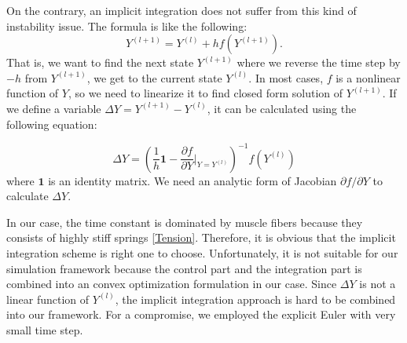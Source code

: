 \documentclass[master,english,final]{kaist-ucs}
\begin{document}
On the contrary, an implicit integration does not suffer from this kind of
instability issue. The formula is like the following:
\begin{equation}
Y^{(l+1)}=Y^{(l)} + hf(Y^{(l+1)}).
\end{equation}
That is, we want to find the next state $Y^{(l+1)}$ where we
reverse the time step by $-h$ from $Y^{(l+1)}$, we get to the current state
$Y^{(l)}$. In most cases, $f$ is a nonlinear function of $Y$, so we need to
linearize it to find closed form solution of $Y^{(l+1)}$. If we define a
variable $\Delta Y = Y^{(l+1)}-Y^{(l)}$, it can be calculated using the
following equation:

\begin{equation}\label{DeltaY}
\Delta Y = \left(  \frac{1}{h}\mathbf{1} - {\frac{\partial f}{\partial Y} \bigg|_{Y=Y^{(l)}}}\right)^{-1} f(Y^{(l)})
\end{equation}
where $\mathbf{1}$ is an identity matrix. We need an analytic form of
Jacobian $\partial f / \partial Y$ to calculate $\Delta Y$.

In our case, the time constant is dominated by muscle fibers because they consists
of highly stiff springs \eqref{Tension}. Therefore, it is obvious that
the implicit integration scheme is right one to choose.
Unfortunately, it is not suitable for our simulation framework because
the control part and the integration part is combined into an convex optimization formulation in our case.
Since $\Delta Y$ is not a linear function of $Y^{(l)}$, the implicit integration approach
is hard to be combined into our framework. For a compromise, we employed the explicit Euler
with very small time step.
\end{document}
